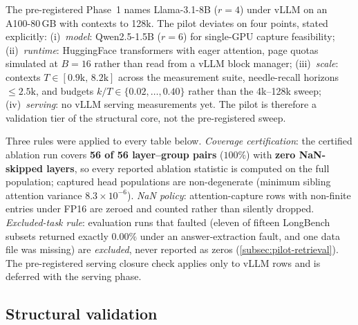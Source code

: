 \documentclass[final,5p,times,twocolumn]{elsarticle}
\theoremstyle{definition}
\theoremstyle{remark}
\begin{document}
The pre-registered Phase~1 names Llama-3.1-8B ($r{=}4$) under vLLM on
an A100-80\,GB with contexts to 128k. The pilot deviates on four
points, stated explicitly: (i)~\emph{model}: Qwen2.5-1.5B ($r{=}6$)
for single-GPU capture feasibility; (ii)~\emph{runtime}: HuggingFace
transformers with eager attention, page quotas simulated at $B{=}16$ rather than read from a vLLM block manager; (iii)~\emph{scale}:
contexts $T\in[0.9\text{k},\,8.2\text{k}]$ across the measurement
suite, needle-recall horizons $\le 2.5\text{k}$, and budgets
 $k/T\in\{0.02,\dots,0.40\}$ rather than the 4k--128k sweep;
(iv)~\emph{serving}: no vLLM serving measurements yet. The pilot is
therefore a validation tier of the structural core, not the
pre-registered sweep.

Three rules were applied to every table below. \emph{Coverage
certification}: the certified ablation run covers \textbf{56 of 56
layer--group pairs} ($100\%$) with \textbf{zero NaN-skipped layers}, so
every reported ablation statistic is computed on the full population;
captured head populations are non-degenerate (minimum sibling attention
variance $8.3\times 10^{-6}$). \emph{NaN policy}: attention-capture
rows with non-finite entries under FP16 are zeroed and counted rather
than silently dropped. \emph{Excluded-task rule}: evaluation runs that
faulted (eleven of fifteen LongBench subsets returned exactly $0.00\%$ under an answer-extraction fault, and one data file was missing) are
\emph{excluded}, never reported as zeros
(\cref{subsec:pilot-retrieval}). The pre-registered serving closure
check applies only to vLLM rows and is deferred with the serving phase.

\subsection{Structural validation}
\label{subsec:pilot-structural}
\end{document}
